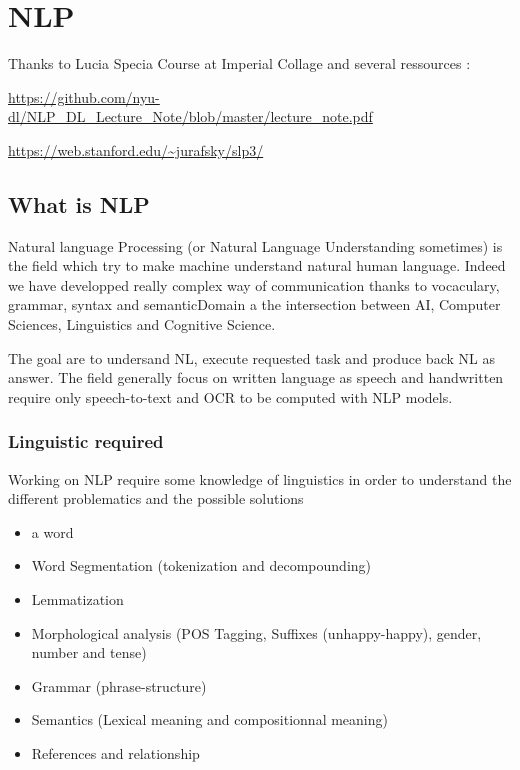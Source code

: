 \chapter{NLP} %
\label{cha:nlp}
		
	Thanks to Lucia Specia Course at Imperial Collage and several ressources : \par
	\url{https://github.com/nyu-dl/NLP_DL_Lecture_Note/blob/master/lecture_note.pdf} \par
	\url{https://web.stanford.edu/~jurafsky/slp3/}
	
	\section{What is NLP}

			Natural language Processing (or Natural Language Understanding sometimes) is the field which try to make machine understand natural human language. Indeed we have developped really complex way of communication thanks to vocaculary, grammar, syntax and semanticDomain a the intersection between AI, Computer Sciences, Linguistics and Cognitive Science.

			The goal are to undersand NL, execute requested task and produce back NL as answer. The field generally focus on written language as speech and handwritten require only speech-to-text and OCR to be computed with NLP models. 

			\subsection{Linguistic required}

				Working on NLP require some knowledge of linguistics in order to understand the different problematics and the possible solutions
				\begin{itemize}
					\item  a word
					\item Word Segmentation (tokenization and decompounding)
					\item Lemmatization
					\item Morphological analysis (POS Tagging, Suffixes (unhappy-happy), gender, number and tense)
					\item Grammar (phrase-structure)
					\item Semantics (Lexical meaning and compositionnal meaning)
					\item References and relationship
				\end{itemize}

